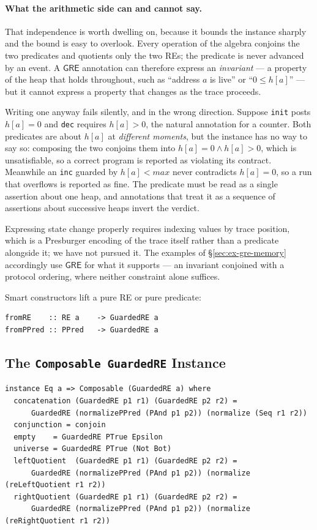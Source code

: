 \documentclass[acmsmall,screen]{acmart}
\newcommand{\GRE}{\mathsf{GRE}}
\begin{document}
\paragraph{What the arithmetic side can and cannot say.}
That independence is worth dwelling on, because it bounds the instance
sharply and the bound is easy to overlook.
Every operation of the algebra conjoins the two predicates and quotients
only the two REs; the predicate is never advanced by an event.
A $\GRE$ annotation can therefore express an \emph{invariant} --- a property
of the heap that holds throughout, such as ``address $a$ is live'' or
``$0 \le h[a]$'' --- but it cannot express a property that changes as the
trace proceeds.

Writing one anyway fails silently, and in the wrong direction.
Suppose \lstinline{init} posts $h[a] = 0$ and \lstinline{dec} requires
$h[a] > 0$, the natural annotation for a counter.
Both predicates are about $h[a]$ at \emph{different moments}, but the
instance has no way to say so: composing the two conjoins them into
$h[a] = 0 \wedge h[a] > 0$, which is unsatisfiable, so a correct program is
reported as violating its contract.
Meanwhile an \lstinline{inc} guarded by $h[a] < \mathit{max}$ never
contradicts $h[a] = 0$, so a run that overflows is reported as fine.
The predicate must be read as a single assertion about one heap, and
annotations that treat it as a sequence of assertions about successive
heaps invert the verdict.

Expressing state change properly requires indexing values by trace
position, which is a Presburger encoding of the trace itself rather than a
predicate alongside it; we have not pursued it.
The examples of \S\ref{sec:ex-gre-memory} accordingly use $\GRE$ for what it
supports --- an invariant conjoined with a protocol ordering, where neither
constraint alone suffices.

Smart constructors lift a pure RE or pure predicate:
\begin{lstlisting}
fromRE    :: RE a    -> GuardedRE a
fromPPred :: PPred   -> GuardedRE a
\end{lstlisting}

\subsection{The \texttt{Composable GuardedRE} Instance}

\begin{lstlisting}
instance Eq a => Composable (GuardedRE a) where
  concatenation (GuardedRE p1 r1) (GuardedRE p2 r2) =
      GuardedRE (normalizePPred (PAnd p1 p2)) (normalize (Seq r1 r2))
  conjunction = conjoin
  empty    = GuardedRE PTrue Epsilon
  universe = GuardedRE PTrue (Not Bot)
  leftQuotient  (GuardedRE p1 r1) (GuardedRE p2 r2) =
      GuardedRE (normalizePPred (PAnd p1 p2)) (normalize (reLeftQuotient r1 r2))
  rightQuotient (GuardedRE p1 r1) (GuardedRE p2 r2) =
      GuardedRE (normalizePPred (PAnd p1 p2)) (normalize (reRightQuotient r1 r2))
\end{lstlisting}
\end{document}
